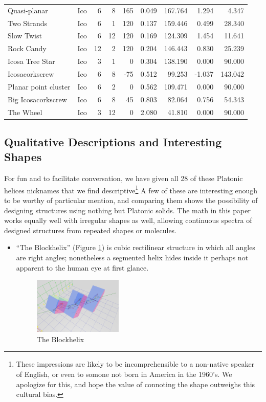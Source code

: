 \documentclass[11pt]{article}
\begin{document}
{\begin{table}[ht]
\begin{tabular}{l l r r r r r r r}
Quasi-planar & Ico &	6 &	8 &	165 &	0.049 &	167.764 & 1.294 & 4.347 \\
Two Strands & Ico &	6 &	1 &	120 &	0.137 &	159.446	& 0.499 & 28.340 \\
Slow Twist & Ico &	6 &	12 &	120 &	0.169 &	124.309	& 1.454	& 11.641 \\
Rock Candy & Ico &	12 &	2 &	120 &	0.204 &	146.443	& 0.830 & 25.239 \\
Icosa Tree Star & Ico &	3 &	1 &	0 &	0.304 &	138.190	& 0.000	& 90.000 \\
Icosacorkscrew & Ico &	6 &	8 &	-75 &	0.512 &	99.253	& -1.037 & 143.042 \\
Planar point cluster & Ico &	6 &	2 &	0 &	0.562 &	109.471 & 0.000 & 90.000 \\
Big Icosacorkscrew  & Ico &	6 &	8 &	45 &	0.803 &	82.064 & 0.756 & 54.343 \\
The Wheel & Ico &	3 &	12 &	0 &	2.080 &	41.810 & 0.000 & 90.000 \\
\hline %
\end{tabular}
\label{table:platonic} %
\end{table}

\subsection{Qualitative Descriptions and Interesting Shapes}

For fun and to facilitate conversation, we have given all
28 of these Platonic helices nicknames that we find descriptive\footnote{These impressions
  are likely to be incomprehensible to a non-native speaker of English, or even to
  somone not born in America in the 1960's. We apologize for this, and hope the value of connoting the shape outweighs this cultural bias.}
A few of these are interesting enough
to be worthy of particular mention, and comparing them
shows the possibility of designing structures using nothing but Platonic solids.
The math in this paper works equally well with irregular shapes as well,
allowing continuous spectra of designed structures from repeated shapes
or molecules.

\begin{itemize}
\item ``The Blockhelix'' (Figure \ref{fig:blockhelix}) is cubic rectilinear structure in which all angles are right angles; nonetheless
  a segmented helix hides inside it perhaps not apparent to the human eye at first glance.
\begin{figure}
     \centering
     \includegraphics[width=0.40\textwidth]{figures/Blockhelix.png}
     \caption{The Blockhelix}
  \label{fig:blockhelix}
\end{figure}


\end{itemize}}
\end{document}
